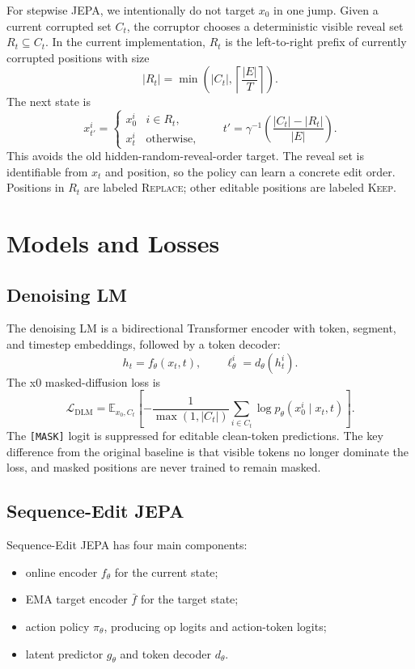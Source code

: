 \documentclass[11pt]{article}
\begin{document}
For stepwise JEPA, we intentionally do not target $x_0$ in one jump.  Given a
current corrupted set $C_t$, the corruptor chooses a deterministic visible
reveal set $R_t \subseteq C_t$.  In the current implementation, $R_t$ is the
left-to-right prefix of currently corrupted positions with size
\[
  |R_t| = \min\left(|C_t|,\left\lceil \frac{|E|}{T}\right\rceil\right).
\]
The next state is
\[
  x_{t'}^i =
  \begin{cases}
    x_0^i & i \in R_t,\\
    x_t^i & \text{otherwise,}
  \end{cases}
  \qquad
  t'=\gamma^{-1}\left(\frac{|C_t|-|R_t|}{|E|}\right).
\]
This avoids the old hidden-random-reveal-order target.  The reveal set is
identifiable from $x_t$ and position, so the policy can learn a concrete edit
order.  Positions in $R_t$ are labeled \textsc{Replace}; other editable
positions are labeled \textsc{Keep}.

\section{Models and Losses}

\subsection{Denoising LM}

The denoising LM is a bidirectional Transformer encoder with token, segment, and
timestep embeddings, followed by a token decoder:
\[
  h_t = f_\theta(x_t,t), \qquad
  \ell_\theta^i = d_\theta(h_t^i).
\]
The x0 masked-diffusion loss is
\[
  \mathcal{L}_{\mathrm{DLM}}
  =
  \mathbb{E}_{x_0,C_t}
  \left[
    -\frac{1}{\max(1,|C_t|)}
    \sum_{i \in C_t}
    \log p_\theta(x_0^i \mid x_t,t)
  \right].
\]
The \texttt{[MASK]} logit is suppressed for editable clean-token predictions.
The key difference from the original baseline is that visible tokens no longer
dominate the loss, and masked positions are never trained to remain masked.

\subsection{Sequence-Edit JEPA}

Sequence-Edit JEPA has four main components:
\begin{itemize}[leftmargin=*]
\item online encoder $f_\theta$ for the current state;
\item EMA target encoder $\bar f$ for the target state;
\item action policy $\pi_\theta$, producing op logits and action-token logits;
\item latent predictor $g_\theta$ and token decoder $d_\theta$.
\end{itemize}
\end{document}
